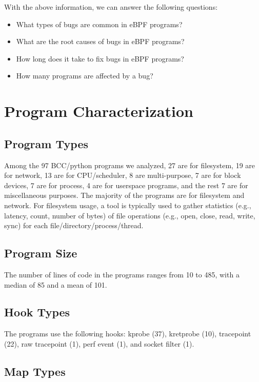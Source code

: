 With the above information, we can answer the following questions:
\begin{itemize}
    \item What types of bugs are common in eBPF programs?
    \item What are the root causes of bugs in eBPF programs?
    \item How long does it take to fix bugs in eBPF programs?
    \item How many programs are affected by a bug?
\end{itemize}

\section{Program Characterization}

\subsection{Program Types}
Among the 97 BCC/python programs we analyzed, 27 are for filesystem, 19 are for network, 13 are for CPU/scheduler, 8 are multi-purpose, 7 are for block devices, 7 are for process, 4 are for userspace programs, and the rest 7 are for miscellaneous purposes.
The majority of the programs are for filesystem and network. 
For filesystem usage, a tool is typically used to gather statistics (e.g., latency, count, number of bytes) of file operations (e.g., open, close, read, write, sync) for each file/directory/process/thread.

\subsection{Program Size}
The number of lines of code in the programs ranges from 10 to 485, with a median of 85 and a mean of 101.

\subsection{Hook Types}
The programs use the following hooks: kprobe (37), kretprobe (10), tracepoint (22), raw tracepoint (1), perf event (1), and socket filter (1). 


\subsection{Map Types}
\todo{}

